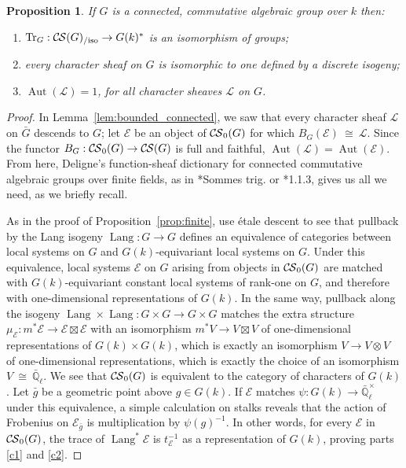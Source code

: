 \documentclass[10pt]{amsart}
\makeatletter
\theoremstyle{plain}
\newtheorem{proposition}[theorem]{Proposition}
\theoremstyle{definition}
\newcommand{\EE}{\mathbb{\bar Q}_\ell}
\newcommand{\Fq}{k}
\newcommand{\EEx}{\EE^\times}
\DeclareMathOperator{\Aut}{Aut}
\DeclareMathOperator{\Lang}{Lang}
\newcommand{\iso}{{\ \cong\ }}
\newcommand{\trFrob}[1]{t_{#1}}
\newcommand{\TrFrob}[1]{\operatorname{Tr}_{#1}}
\newcommand{\cs}[1]{{\mathcal{#1}}}
\newcommand{\CS}{{\mathcal{C\hskip-0.8pt S}}}
\newcommand{\bCS}{{\CS_0}}
\newcommand{\CSiso}[1]{\CS(#1)_{/\text{iso}}}
\newcommand{\labitem}[2]{
\def\@itemlabel{\textbf{#1}}
\item
\def\@currentlabel{#1}\label{#2}}
\newcommand{\bg}{{\bar{g}}}
\newcommand{\bG}{\bar{G}}
\makeatother
\begin{document}
\begin{proposition}\label{prop:connected}
 If $G$ is a connected, commutative algebraic group over $\Fq$ then:
 \begin{enumerate}
 \labitem{(1)}{c1} $\TrFrob{G} : \CSiso{G} \to G(\Fq)^*$ is an isomorphism of groups;
 \labitem{(2)}{c2} every character sheaf on $G$ is isomorphic to one defined by a discrete isogeny;
 \labitem{(3)}{c3} $\Aut(\cs{L}) = 1$, for all character sheaves $\cs{L}$ on $G$.
 \end{enumerate}
 \end{proposition}
\begin{proof}
In Lemma~\ref{lem:bounded_connected}, we saw that every character sheaf $\cs{L}$ on $\bG$ descends to $G$;
let $\cs{E}$ be an object of $\bCS(G)$ for which $B_G(\cs{E}) \iso \cs{L}$.
 Since the functor $B_G : \bCS(G) \to \CS(G)$ is full and faithful, $\Aut(\cs{L}) = \Aut(\cs{E})$.
From here, Deligne's function-sheaf dictionary for connected commutative algebraic groups over finite fields,
as in \cite{deligne:SGA4.5}*{Sommes trig.} or \cite{laumon:87a}*{1.1.3}, gives us all we need, as we briefly recall.

As in the proof of Proposition~\ref{prop:finite}, use \'etale descent to see that pullback by the Lang isogeny $\Lang : G\to G$
defines an equivalence of categories between local systems on $G$ and $G(\Fq)$-equivariant local systems on $G$. 
Under this equivalence, local systems $\cs{E}$ on $G$ arising from objects in $\bCS(G)$ are matched with $G(\Fq)$-equivariant
constant local systems of rank-one on $G$, and therefore with one-dimensional representations of $G(\Fq)$. 
In the same way, pullback along the isogeny $\Lang\times\Lang : G\times G\to G\times G$ matches the extra structure
$\mu_\cs{E} : m^*\cs{E} \to \cs{E}\boxtimes\cs{E}$ with an isomorphism $m^*V \to V\boxtimes V$ of one-dimensional
representations of $G(\Fq)\times G(\Fq)$, which is exactly an isomorphism $V \to V\otimes V$ of one-dimensional representations,
which is exactly the choice of an isomorphism $V\iso \EE$.
We see that $\bCS(G)$ is equivalent to the category of characters of $G(\Fq)$.
Let $\bg$ be a geometric point above $g \in G(\Fq)$.  If $\cs{E}$ matches $\psi : G(\Fq)\to \EEx$ under this equivalence,
a simple calculation on stalks reveals that the action of Frobenius on $\cs{E}_{\bg}$ is multiplication by $\psi(g)^{-1}$.
In other words, for every $\cs{E}$ in $\bCS(G)$, the trace of $\Lang^*\cs{E}$ is $\trFrob{\cs{E}}^{-1}$ as a
representation of $G(\Fq)$, proving parts \ref{c1} and \ref{c2}.


\end{proof}
\end{document}

